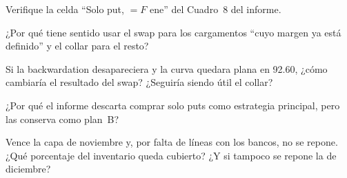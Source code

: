 \ejercicio[cálculo] Verifique la celda \enquote{Solo put, $=F$ ene} del Cuadro~8 del informe.

\ejercicio[conceptual] ¿Por qué tiene sentido usar el swap para los cargamentos \enquote{cuyo margen ya está definido} y el collar para el resto?

\ejercicio[conceptual] Si la backwardation desapareciera y la curva quedara plana en 92.60, ¿cómo cambiaría el resultado del swap? ¿Seguiría siendo útil el collar?

\ejercicio[conceptual] ¿Por qué el informe descarta comprar solo puts como estrategia principal, pero las conserva como plan~B?

\ejercicio[cálculo] Vence la capa de noviembre y, por falta de líneas con los bancos, no se repone. ¿Qué porcentaje del inventario queda cubierto? ¿Y si tampoco se repone la de diciembre?
